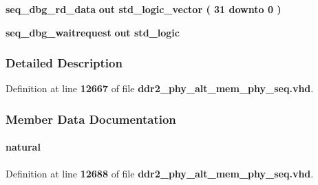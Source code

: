 \begin{DoxyCompactItemize}
\item 
{\bf seq\+\_\+dbg\+\_\+rd\+\_\+data}  {\bfseries {\bfseries \textcolor{keywordflow}{out}\textcolor{vhdlchar}{ }}} {\bfseries \textcolor{comment}{std\+\_\+logic\+\_\+vector}\textcolor{vhdlchar}{ }\textcolor{vhdlchar}{(}\textcolor{vhdlchar}{ }\textcolor{vhdlchar}{ } \textcolor{vhdldigit}{31} \textcolor{vhdlchar}{ }\textcolor{keywordflow}{downto}\textcolor{vhdlchar}{ }\textcolor{vhdlchar}{ } \textcolor{vhdldigit}{0} \textcolor{vhdlchar}{ }\textcolor{vhdlchar}{)}\textcolor{vhdlchar}{ }} 
\item 
{\bf seq\+\_\+dbg\+\_\+waitrequest}  {\bfseries {\bfseries \textcolor{keywordflow}{out}\textcolor{vhdlchar}{ }}} {\bfseries \textcolor{comment}{std\+\_\+logic}\textcolor{vhdlchar}{ }} 
\end{DoxyCompactItemize}


\subsubsection{Detailed Description}


Definition at line {\bf 12667} of file {\bf ddr2\+\_\+phy\+\_\+alt\+\_\+mem\+\_\+phy\+\_\+seq.\+vhd}.



\subsubsection{Member Data Documentation}
\paragraph[{A\+D\+V\+\_\+\+L\+A\+T\+\_\+\+W\+I\+D\+TH}]{ {\bfseries \textcolor{vhdlchar}{ }} {\bfseries \textcolor{comment}{natural}\textcolor{vhdlchar}{ }} \hspace{0.3cm}{\ttfamily [Generic]}}\label{classddr2__phy__alt__mem__phy__seq_a3897150e7063e741d73357e26161c904}


Definition at line {\bf 12688} of file {\bf ddr2\+\_\+phy\+\_\+alt\+\_\+mem\+\_\+phy\+\_\+seq.\+vhd}.

